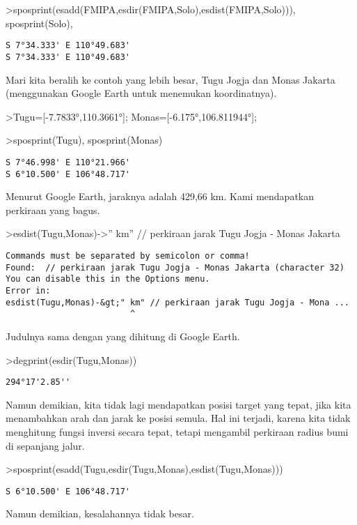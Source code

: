 \documentclass[
]{book}
\begin{document}
\textgreater sposprint(esadd(FMIPA,esdir(FMIPA,Solo),esdist(FMIPA,Solo))), sposprint(Solo),

\begin{verbatim}
S 7°34.333' E 110°49.683'
S 7°34.333' E 110°49.683'
\end{verbatim}

Mari kita beralih ke contoh yang lebih besar, Tugu Jogja dan Monas Jakarta (menggunakan Google Earth untuk menemukan koordinatnya).

\textgreater Tugu={[}-7.7833°,110.3661°{]}; Monas={[}-6.175°,106.811944°{]};

\textgreater sposprint(Tugu), sposprint(Monas)

\begin{verbatim}
S 7°46.998' E 110°21.966'
S 6°10.500' E 106°48.717'
\end{verbatim}

Menurut Google Earth, jaraknya adalah 429,66 km. Kami mendapatkan perkiraan yang bagus.

\textgreater esdist(Tugu,Monas)-\textgreater'' km'' // perkiraan jarak Tugu Jogja - Monas Jakarta

\begin{verbatim}
Commands must be separated by semicolon or comma!
Found:  // perkiraan jarak Tugu Jogja - Monas Jakarta (character 32)
You can disable this in the Options menu.
Error in:
esdist(Tugu,Monas)-&gt;" km" // perkiraan jarak Tugu Jogja - Mona ...
                         ^
\end{verbatim}

Judulnya sama dengan yang dihitung di Google Earth.

\textgreater degprint(esdir(Tugu,Monas))

\begin{verbatim}
294°17'2.85''
\end{verbatim}

Namun demikian, kita tidak lagi mendapatkan posisi target yang tepat, jika kita menambahkan arah dan jarak ke posisi semula. Hal ini terjadi, karena kita tidak menghitung fungsi inversi secara tepat, tetapi mengambil perkiraan radius bumi di sepanjang jalur.

\textgreater sposprint(esadd(Tugu,esdir(Tugu,Monas),esdist(Tugu,Monas)))

\begin{verbatim}
S 6°10.500' E 106°48.717'
\end{verbatim}

Namun demikian, kesalahannya tidak besar.
\end{document}
